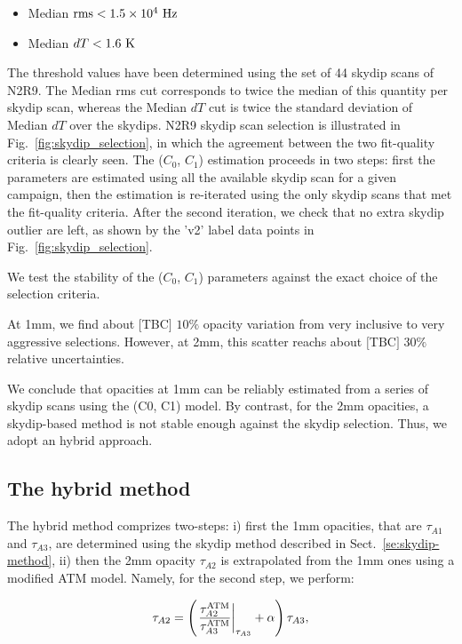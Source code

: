 \begin{itemize}
\item Median $\rm{rms} < 1.5 \times 10^{4}~\rm{Hz}$
\item Median $dT < 1.6~\rm{K}$
\end{itemize}

The threshold values have been determined using the set of 44 skydip
scans of N2R9. The Median rms cut corresponds to twice the median of
this quantity per skydip scan, whereas the Median $dT$ cut is twice
the standard deviation of Median $dT$ over the skydips. N2R9 skydip
scan selection is illustrated in Fig.~\ref{fig:skydip_selection}, in
which the agreement between the two fit-quality criteria is clearly
seen. The ($C_0$, $C_1$) estimation proceeds in two steps: first the
parameters are estimated using all the available skydip scan for a
given campaign, then the estimation is re-iterated using the only
skydip scans that met the fit-quality criteria. After the second
iteration, we check that no extra skydip outlier are left, as shown by
the 'v2' label data points in Fig.~\ref{fig:skydip_selection}.


We test the stability of the ($C_0$, $C_1$) parameters against the exact choice of the selection criteria.  


At 1mm, we find about {\color{red} $[$TBC$]$  $10\%$} opacity variation from very inclusive to very aggressive selections. However, at 2mm, this scatter reachs about {\color{red} $[$TBC$]$  $30\%$} relative uncertainties.


We conclude that opacities at 1mm can be reliably estimated from a series of skydip scans using the (C0, C1) model. By contrast, for the 2mm opacities, a skydip-based method is not stable enough against the skydip selection. Thus, we adopt an hybrid approach. 

\subsection{The hybrid method}

The hybrid method comprizes two-steps: i) first the 1mm opacities,
that are $\tau_{A1}$ and $\tau_{A3}$, are determined using the skydip
method described in Sect.~\ref{se:skydip-method}, ii) then the 2mm
opacity $\tau_{A2}$ is extrapolated from the 1mm ones using a modified
ATM model. Namely, for the second step, we perform:

\begin{equation}
\tau_{A2} = \left( \left.\frac{\tau_{A2}^{\rm{ATM}}}{\tau_{A3}^{\rm{ATM}}}\right\vert_{\tau_{A3}} + \alpha \right) \tau_{A3},
\end{equation}

